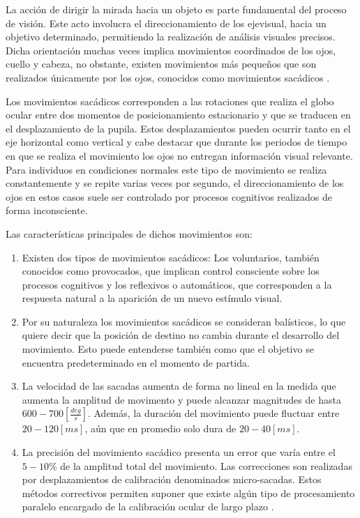 \documentclass[../main.tex]{subfiles}
\begin{document}
		La acción de dirigir la mirada hacia un objeto es parte fundamental del proceso de visión. Este acto involucra el direccionamiento de los \gls{ejevisual}, hacia un objetivo determinado, permitiendo la realización de análisis visuales precisos. Dicha orientación muchas veces implica movimientos coordinados de los ojos, cuello y cabeza, no obstante, existen movimientos más pequeños que son realizados únicamente por los ojos, conocidos como movimientos sacádicos \cite{article:movOcular, website:movOcular}.

		Los movimientos sacádicos corresponden a las rotaciones que realiza el globo ocular entre dos momentos de posicionamiento estacionario y que se traducen en el desplazamiento de la pupila. Estos desplazamientos pueden ocurrir tanto en el eje horizontal como vertical y cabe destacar que durante los periodos de tiempo en que se realiza el movimiento los ojos no entregan información visual relevante. Para individuos en condiciones normales este tipo de movimiento se realiza constantemente y se repite varias veces por segundo, el direccionamiento de los ojos en estos casos suele ser controlado por procesos cognitivos realizados de forma inconsciente.

		\newpage
		Las características principales de dichos movimientos son:
		\begin{enumerate}
			\item Existen dos tipos de movimientos sacádicos: Los voluntarios, también conocidos como provocados, que implican control consciente sobre los procesos cognitivos y los reflexivos o automáticos, que corresponden a la respuesta natural a la aparición de un nuevo estímulo visual.

			\item Por su naturaleza los movimientos sacádicos se consideran balísticos, lo que quiere decir que la posición de destino no cambia durante el desarrollo del movimiento. Esto puede entenderse también como que el objetivo se encuentra predeterminado en el momento de partida.

			\item La velocidad de las sacadas aumenta de forma no lineal en la medida que aumenta la amplitud de movimento y puede alcanzar magnitudes de hasta $600 - 700[\frac{deg}{s}]$. Además, la duración del movimiento puede fluctuar entre $20 - 120[ms]$, aún que en promedio solo dura de $20-40[ms]$. 

			\item La precisión del movimiento sacádico presenta un error que varía entre el $5-10\%$ de la amplitud total del movimiento. Las correcciones son realizadas por desplazamientos de calibración denominados micro-sacadas. Estos métodos correctivos permiten suponer que existe algún tipo de procesamiento paralelo encargado de la calibración ocular de largo plazo \cite{website:movOcular}.  

		\end{enumerate}
\end{document}
